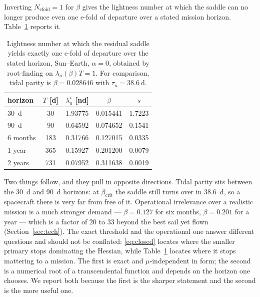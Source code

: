 \documentclass[11pt,a4paper]{article}
\begin{document}
Inverting $N_{\mathrm{efold}}=1$ for $\beta$ gives the lightness number at which
the saddle can no longer produce even one e-fold of departure over a stated
mission horizon. Table~\ref{tab:efold} reports it.

\begin{table}[t]
  \centering
  \caption{Lightness number at which the residual saddle yields exactly one
  e-fold of departure over the stated horizon, Sun--Earth, $\alpha=0$, obtained
  by root-finding on $\lambda_u(\beta)T=1$. For comparison, tidal parity is
  $\beta=\num{0.028646}$ with $\tau_u=\SI{38.6}{\day}$.}
  \label{tab:efold}
  \begin{tabular}{lcccc}
    \toprule
    horizon & $T$ [d] & $\lambda_u^{\star}$ [nd] & $\beta$ & $s$ \\
    \midrule
    \SI{30}{\day}  & \num{30}  & \num{1.93775} & \num{0.015441} & \num{1.7223} \\
    \SI{90}{\day}  & \num{90}  & \num{0.64592} & \num{0.074652} & \num{0.1541} \\
    6 months       & \num{183} & \num{0.31766} & \num{0.127015} & \num{0.0335} \\
    1 year         & \num{365} & \num{0.15927} & \num{0.201200} & \num{0.0079} \\
    2 years        & \num{731} & \num{0.07952} & \num{0.311638} & \num{0.0019} \\
    \bottomrule
  \end{tabular}
\end{table}

Two things follow, and they pull in opposite directions. Tidal parity sits
between the \SI{30}{\day} and \SI{90}{\day} horizons: at $\beta_{\mathrm{crit}}$
the saddle still turns over in \SI{38.6}{\day}, so a spacecraft there is very
far from free of it. Operational irrelevance over a realistic mission is a much
stronger demand --- $\beta=0.127$ for six months, $\beta=0.201$ for a year ---
which is a factor of $20$ to $33$ beyond the best sail yet flown
(Section~\ref{sec:tech}). The exact threshold and the operational one answer
different questions and should not be conflated: \eqref{eq:closed} locates where
the smaller primary stops dominating the Hessian, while
Table~\ref{tab:efold} locates where it stops mattering to a mission. The first
is exact and $\mu$-independent in form; the second is a numerical root of a
transcendental function and depends on the horizon one chooses. We report both
because the first is the sharper statement and the second is the more useful
one.
\end{document}
